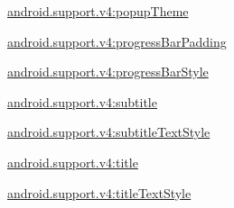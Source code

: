 {\ttfamily \hyperlink{classandroid_1_1support_1_1v4_1_1R_1_1styleable_af119aa9f8a6ea23d2126ea383dabfecf}{android.\+support.\+v4\+:popup\+Theme}}

{\ttfamily \hyperlink{classandroid_1_1support_1_1v4_1_1R_1_1styleable_abfc806e138832b59961a03dd3ea028a5}{android.\+support.\+v4\+:progress\+Bar\+Padding}}

{\ttfamily \hyperlink{classandroid_1_1support_1_1v4_1_1R_1_1styleable_a8a084dd5197bac512fb1f451fe3c4f09}{android.\+support.\+v4\+:progress\+Bar\+Style}}

{\ttfamily \hyperlink{classandroid_1_1support_1_1v4_1_1R_1_1styleable_a1738ca6c1d0d6244db6783c6990e20a8}{android.\+support.\+v4\+:subtitle}}

{\ttfamily \hyperlink{classandroid_1_1support_1_1v4_1_1R_1_1styleable_abd6b087231fbace7aa513febebda8b29}{android.\+support.\+v4\+:subtitle\+Text\+Style}}

{\ttfamily \hyperlink{classandroid_1_1support_1_1v4_1_1R_1_1styleable_a342a7d8b0f7041ad4c7860c268da0784}{android.\+support.\+v4\+:title}}

{\ttfamily \hyperlink{classandroid_1_1support_1_1v4_1_1R_1_1styleable_a185298c5a3c99e803809f41a523be2a6}{android.\+support.\+v4\+:title\+Text\+Style}}

